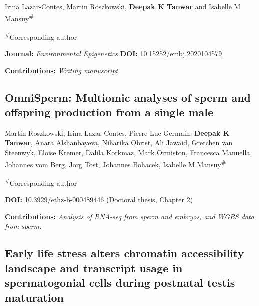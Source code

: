 \documentclass[12pt,twoside]{reedthesis}
\begin{document}
Irina Lazar-Contes, Martin Roszkowski, \textbf{Deepak K Tanwar} and Isabelle M Mansuy\textsuperscript{\#}

\textsuperscript{\#}Corresponding author \newline 

\textbf{Journal:} \emph{Environmental Epigenetics} \newline 
\textbf{DOI:} \href{https://doi.org/10.15252/embj.2020104579}{10.15252/embj.2020104579}\newline 

\textbf{Contributions:} \emph{Writing manuscript.}

\hypertarget{omnisperm-multiomic-analyses-of-sperm-and-offspring-production-from-a-single-male}{%
\subsection*{OmniSperm: Multiomic analyses of sperm and offspring production from a single male}\label{omnisperm-multiomic-analyses-of-sperm-and-offspring-production-from-a-single-male}}

Martin Roszkowski, Irina Lazar-Contes, Pierre-Luc Germain, \textbf{Deepak K Tanwar}, Anara Alshanbayeva, Niharika Obrist, Ali Jawaid, Gretchen van Steenwyk, Eloise Kremer, Dalila Korkmaz, Mark Ormiston, Francesca Manuella, Johannes vom Berg, Jorg Tost, Johannes Bohacek, Isabelle M Mansuy\textsuperscript{\#}

\textsuperscript{\#}Corresponding author \newline 

\textbf{DOI:} \href{https://doi.org/10.3929/ethz-b-000489446}{10.3929/ethz-b-000489446} (Doctoral thesis, Chapter 2)\newline 

\textbf{Contributions:} \emph{Analysis of RNA-seq from sperm and embryos, and WGBS data from sperm.}

\hypertarget{early-life-stress-alters-chromatin-accessibility-landscape-and-transcript-usage-in-spermatogonial-cells-during-postnatal-testis-maturation}{%
\subsection*{Early life stress alters chromatin accessibility landscape and transcript usage in spermatogonial cells during postnatal testis maturation}\label{early-life-stress-alters-chromatin-accessibility-landscape-and-transcript-usage-in-spermatogonial-cells-during-postnatal-testis-maturation}}
\end{document}

